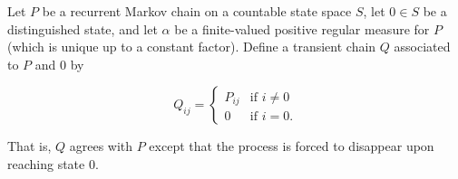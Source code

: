 Let $P$ be a recurrent Markov chain on a countable state space $S$, let $0 \in S$ be a distinguished state, and let $\alpha$ be a finite-valued positive regular measure for $P$ (which is unique up to a constant factor). Define a transient chain $Q$ associated to $P$ and $0$ by

$$Q_{ij} = \begin{cases} P_{ij} & \text{if } i \neq 0 \\ 0 & \text{if } i = 0. \end{cases}$$

That is, $Q$ agrees with $P$ except that the process is forced to disappear upon reaching state $0$.
